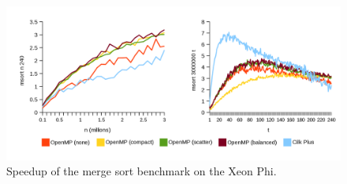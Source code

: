 \documentclass{report}
\begin{document}
\noindent
\begin{figure}[t!]
	\includegraphics[width=\linewidth]{../../charts/mic/msort_speedup}
	\caption{Speedup of the merge sort benchmark on the Xeon Phi.}
	\label{Fig:msortmicspeedup}
\end{figure}
\end{document}
